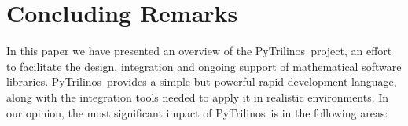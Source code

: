 \documentclass[10pt,relax]{SANDreport}
\newcommand{\PyTrilinos}{{PyTrilinos}}
\begin{document}
%
\section{Concluding Remarks}
\label{sec:concluding}

In this paper we have presented an overview of the \PyTrilinos\ project, an
effort to facilitate the design, integration and ongoing support of
mathematical software libraries.  \PyTrilinos\ provides a simple but powerful
rapid development language, along with the integration tools needed to apply
it in realistic environments. In our opinion, the most significant impact of
\PyTrilinos\ is in the following areas:
\end{document}
